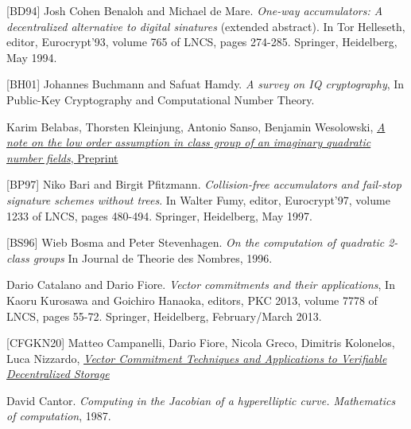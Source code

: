 \documentclass[11pt, lettersize, notitlepage, leqno, footskip=0.6cm]{article}
\newcommand{\noin}{\noindent}
\numberwithin{equation}{section}
\begin{document}
\noin \hypertarget{BD94}{[BD94]} Josh Cohen Benaloh and Michael de Mare. \textit{One-way accumulators: A decentralized alternative to digital sinatures} (extended abstract). In Tor Helleseth, editor, Eurocrypt'93, volume 765 of LNCS, pages 274-285. Springer, Heidelberg, May 1994.\vspace{0.1cm}

\noin \hypertarget{BH01}{[BH01]} Johannes Buchmann and Safuat Hamdy. \textit{A survey on IQ cryptography}, In Public-Key Cryptography and Computational Number Theory. \vspace{0.1cm}

\noin [BKSW20] Karim Belabas, Thorsten Kleinjung, Antonio Sanso, Benjamin Wesolowski, \href{https://eprint.iacr.org/2020/1310}{\textit{A note on the low order assumption in class group of an imaginary quadratic number fields}, Preprint} \vspace{0.1cm}

\noin \hypertarget{BP97}{[BP97]} Niko Bari and Birgit Pfitzmann. \textit{Collision-free accumulators and fail-stop signature schemes without trees}. In Walter Fumy, editor, Eurocrypt'97, volume 1233 of LNCS, pages 480-494. Springer, Heidelberg, May 1997. \vspace{0.1cm}

\noin \hypertarget{BS96}{[BS96]} Wieb Bosma and Peter Stevenhagen. \textit{On the computation of quadratic 2-class groups} In Journal de Theorie des Nombres, 1996. \vspace{0.1cm}

\noin [CF13] Dario Catalano and Dario Fiore. \textit{Vector commitments and their applications}, In Kaoru Kurosawa and Goichiro Hanaoka, editors, PKC 2013, volume 7778 of LNCS, pages 55-72. Springer, Heidelberg, February/March 2013. \vspace{0.1cm}

\noin \hypertarget{CFGKN20}{[CFGKN20]} Matteo Campanelli, Dario Fiore, Nicola Greco, Dimitris Kolonelos, Luca Nizzardo, \href{https://eprint.iacr.org/2020/149}{\textit{Vector Commitment Techniques and Applications to Verifiable Decentralized Storage}} \vspace{0.1cm}


\noin [Can87] David Cantor. \textit{Computing in the Jacobian of a hyperelliptic curve. Mathematics of computation}, 1987.\vspace{0.1cm}
\end{document}

